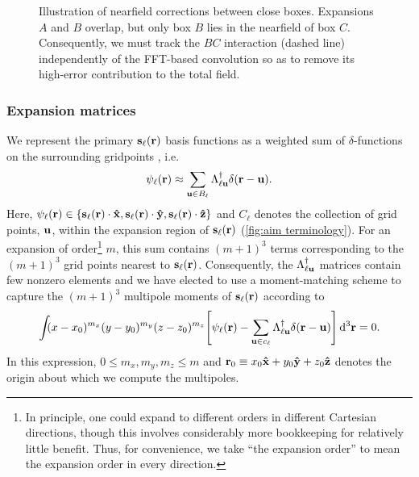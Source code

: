 \begin{figure}
  \centering
  \caption{\label{fig:nearfield correction}Illustration of nearfield corrections between close boxes.
    Expansions $A$ and $B$ overlap, but only box $B$ lies in the nearfield of box $C$.
    Consequently, we must track the $BC$ interaction (dashed line) independently of the FFT-based convolution so as to remove its high-error contribution to the total field.
  }
\end{figure}

\subsubsection{Expansion matrices}

We represent the primary $\vb{s}_\ell(\vb{r})$ basis functions as a weighted sum of $\delta$-functions on the surrounding gridpoints , i.e.
\begin{equation}
  \psi_\ell(\vb{r}) \approx \sum_{\vb{u} \in B_{\ell}} \Lambda_{\ell\vb{u}}^\dagger \delta(\vb{r} - \vb{u}).
  \label{eq:grid linear combination}
\end{equation}
Here, $\psi_\ell(\vb{r}) \in \qty{\vb{s}_\ell(\vb{r})\cdot \vu{x}, \vb{s}_\ell(\vb{r}) \cdot \vu{y}, \vb{s}_\ell(\vb{r}) \cdot \vu{z}}$ and $C_\ell$ denotes the collection of grid points, $\vb{u}$, within the expansion region of $\vb{s}_\ell(\vb{r})$ (\cref{fig:aim terminology}).
For an expansion of order\footnote{In principle, one could expand to different orders in different Cartesian directions, though this involves considerably more bookkeeping for relatively little benefit. Thus, for convenience, we take ``the expansion order'' to mean the expansion order in every direction.} $m$, this sum contains $(m + 1)^3$ terms corresponding to the $(m + 1)^3$ grid points nearest to $\vb{s}_\ell(\vb{r})$.
Consequently, the $\Lambda_{\ell \vb{u}}^\dagger$ matrices contain few nonzero elements and we have elected to use a moment-matching scheme to capture the $(m + 1)^3$ multipole moments of $\vb{s}_\ell(\vb{r})$ according to
\begin{equation}
  \int_{} \kern0.1em (x - x_0)^{m_x}(y - y_0)^{m_y}(z - z_0)^{m_z} \qty[\psi_\ell(\vb{r}) - \sum_{\vb{u} \in c_\ell} \Lambda_{\ell\vb{u}}^\dagger \delta(\vb{r} - \vb{u})] \dd[3]{\vb{r}} = 0.
  \label{eq:moment matching}
\end{equation}
In this expression, $0 \leqslant m_x, m_y, m_z \leqslant m$ and $\vb{r}_0 \equiv x_0 \vu{x} + y_0 \vu{y} + z_0\vu{z}$ denotes the origin about which we compute the multipoles.
